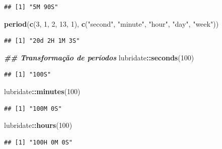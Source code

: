 \documentclass[
]{article}
\newenvironment{Shaded}{\begin{snugshade}}{\end{snugshade}}
\newcommand{\DecValTok}[1]{\textcolor[rgb]{0.00,0.00,0.81}{#1}}
\newcommand{\DocumentationTok}[1]{\textcolor[rgb]{0.56,0.35,0.01}{\textbf{\textit{#1}}}}
\newcommand{\FunctionTok}[1]{\textcolor[rgb]{0.13,0.29,0.53}{\textbf{#1}}}
\newcommand{\NormalTok}[1]{#1}
\newcommand{\SpecialCharTok}[1]{\textcolor[rgb]{0.81,0.36,0.00}{\textbf{#1}}}
\newcommand{\StringTok}[1]{\textcolor[rgb]{0.31,0.60,0.02}{#1}}
\begin{document}
\begin{verbatim}
## [1] "5M 90S"
\end{verbatim}

\begin{Shaded}
\begin{Highlighting}[]
\FunctionTok{period}\NormalTok{(}\FunctionTok{c}\NormalTok{(}\DecValTok{3}\NormalTok{, }\DecValTok{1}\NormalTok{, }\DecValTok{2}\NormalTok{, }\DecValTok{13}\NormalTok{, }\DecValTok{1}\NormalTok{), }\FunctionTok{c}\NormalTok{(}\StringTok{"second"}\NormalTok{, }\StringTok{"minute"}\NormalTok{, }\StringTok{"hour"}\NormalTok{, }\StringTok{"day"}\NormalTok{, }\StringTok{"week"}\NormalTok{))}
\end{Highlighting}
\end{Shaded}

\begin{verbatim}
## [1] "20d 2H 1M 3S"
\end{verbatim}

\begin{Shaded}
\begin{Highlighting}[]
\DocumentationTok{\#\# Transformação de períodos}
\NormalTok{lubridate}\SpecialCharTok{::}\FunctionTok{seconds}\NormalTok{(}\DecValTok{100}\NormalTok{)}
\end{Highlighting}
\end{Shaded}

\begin{verbatim}
## [1] "100S"
\end{verbatim}

\begin{Shaded}
\begin{Highlighting}[]
\NormalTok{lubridate}\SpecialCharTok{::}\FunctionTok{minutes}\NormalTok{(}\DecValTok{100}\NormalTok{)}
\end{Highlighting}
\end{Shaded}

\begin{verbatim}
## [1] "100M 0S"
\end{verbatim}

\begin{Shaded}
\begin{Highlighting}[]
\NormalTok{lubridate}\SpecialCharTok{::}\FunctionTok{hours}\NormalTok{(}\DecValTok{100}\NormalTok{)}
\end{Highlighting}
\end{Shaded}

\begin{verbatim}
## [1] "100H 0M 0S"
\end{verbatim}
\end{document}
